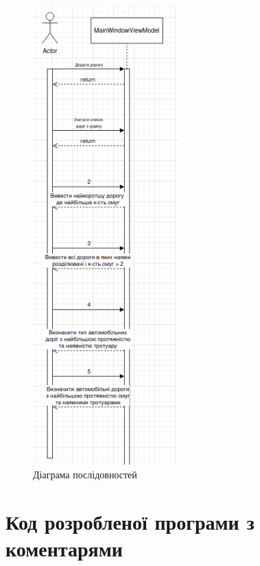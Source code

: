 \documentclass[14pt]{extarticle}
\begin{document}
\begin{figure}[H]
    \centering
    \includegraphics[width=0.50\textwidth]{sequence}
    \caption{Діаграма послідовностей}
\end{figure}

\section{Код розробленої програми з коментарями}
\end{document}

